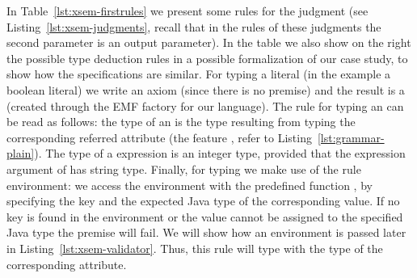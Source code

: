 In Table~\ref{lst:xsem-firstrules} we present some rules for the judgment
 (see Listing~\ref{lst:xsem-judgments}, recall that in the rules of
these judgments the second parameter is an output parameter).
In the table we also show on the right the possible type deduction rules in a
possible formalization of our case study, to show how the specifications are
similar.  For typing a literal (in the example a boolean literal) we write an
axiom (since there is no premise) and the result is a  (created through the EMF factory for our language).  The rule for typing an  can
be read as follows: the type of an  is the type resulting
from typing the corresponding referred attribute (the feature , refer
to Listing~\ref{lst:grammar-plain}). The type of a  expression is
an integer type, provided that the expression argument of  has
string type.  Finally, for typing  we make use of the
rule environment: we access the environment with the predefined function
, by specifying the key and the expected Java type of the
corresponding value.  If no key is found in the environment or the value cannot
be assigned to the specified Java type the premise will fail.  We will show
how an environment is passed later in Listing~\ref{lst:xsem-validator}.  Thus,
this rule will type  with the type of the corresponding
attribute.

% 
% 

